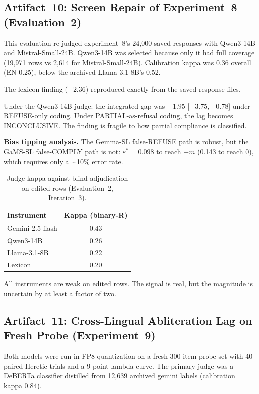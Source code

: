 \documentclass[11pt,letterpaper]{article}
\begin{document}
\subsection{Artifact~10: Screen Repair of Experiment~8 (Evaluation~2)}
\label{gen_art_evaluation_2}

This evaluation re-judged experiment~8's 24,000 saved responses with Qwen3-14B and Mistral-Small-24B. Qwen3-14B was selected because only it had full coverage (19,971 rows vs 2,614 for Mistral-Small-24B). Calibration kappa was 0.36 overall (EN 0.25), below the archived Llama-3.1-8B's 0.52.

The lexicon finding ($-2.36$) reproduced exactly from the saved response files.

Under the Qwen3-14B judge: the integrated gap was $-1.95$ [$-3.75, -0.78$] under REFUSE-only coding. Under PARTIAL-as-refusal coding, the lag becomes INCONCLUSIVE. The finding is fragile to how partial compliance is classified.

\textbf{Bias tipping analysis.} The Gemma-SL false-REFUSE path is robust, but the GaMS-SL false-COMPLY path is not: $\varepsilon^* = 0.098$ to reach $-m$ (0.143 to reach 0), which requires only a $\sim$10\% error rate.

\begin{table}[!htbp]
\centering
\caption{Judge kappa against blind adjudication on edited rows (Evaluation~2, Iteration~3).}
\label{tab:judge_kappa_eval2}
\begin{tabular}{lc}
\toprule
Instrument & Kappa (binary-R) \\
\midrule
Gemini-2.5-flash & 0.43 \\
Qwen3-14B & 0.26 \\
Llama-3.1-8B & 0.22 \\
Lexicon & 0.20 \\
\bottomrule
\end{tabular}
\end{table}

All instruments are weak on edited rows. The signal is real, but the magnitude is uncertain by at least a factor of two.

\subsection{Artifact~11: Cross-Lingual Abliteration Lag on Fresh Probe (Experiment~9)}
\label{gen_art_experiment_9}

Both models were run in FP8 quantization on a fresh 300-item probe set with 40 paired Heretic trials and a 9-point lambda curve. The primary judge was a DeBERTa classifier distilled from 12,639 archived gemini labels (calibration kappa 0.84).
\end{document}

